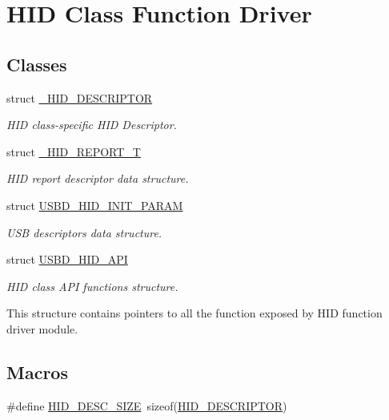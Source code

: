 \hypertarget{group___u_s_b_d___h_i_d}{}\section{H\+ID Class Function Driver}
\label{group___u_s_b_d___h_i_d}
\subsection*{Classes}
\begin{DoxyCompactItemize}
\item 
struct \hyperlink{struct___h_i_d___d_e_s_c_r_i_p_t_o_r}{\+\_\+\+H\+I\+D\+\_\+\+D\+E\+S\+C\+R\+I\+P\+T\+OR}
\begin{DoxyCompactList}\small\item\em H\+ID class-\/specific H\+ID Descriptor. \end{DoxyCompactList}\item 
struct \hyperlink{struct___h_i_d___r_e_p_o_r_t___t}{\+\_\+\+H\+I\+D\+\_\+\+R\+E\+P\+O\+R\+T\+\_\+T}
\begin{DoxyCompactList}\small\item\em H\+ID report descriptor data structure. \end{DoxyCompactList}\item 
struct \hyperlink{struct_u_s_b_d___h_i_d___i_n_i_t___p_a_r_a_m}{U\+S\+B\+D\+\_\+\+H\+I\+D\+\_\+\+I\+N\+I\+T\+\_\+\+P\+A\+R\+AM}
\begin{DoxyCompactList}\small\item\em U\+SB descriptors data structure. \end{DoxyCompactList}\item 
struct \hyperlink{struct_u_s_b_d___h_i_d___a_p_i}{U\+S\+B\+D\+\_\+\+H\+I\+D\+\_\+\+A\+PI}
\begin{DoxyCompactList}\small\item\em H\+ID class A\+PI functions structure.

This structure contains pointers to all the function exposed by H\+ID function driver module. \end{DoxyCompactList}\end{DoxyCompactItemize}
\subsection*{Macros}
\begin{DoxyCompactItemize}
\item 
\#define \hyperlink{group___u_s_b_d___h_i_d_ga5ff0f82d743784b185a3a82a726733d9}{H\+I\+D\+\_\+\+D\+E\+S\+C\+\_\+\+S\+I\+ZE}~sizeof(\hyperlink{group___u_s_b_d___h_i_d_ga683d4339556ecbba7d2062c3f90336e8}{H\+I\+D\+\_\+\+D\+E\+S\+C\+R\+I\+P\+T\+OR})
\end{DoxyCompactItemize}
